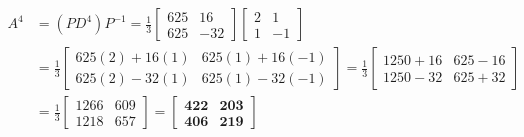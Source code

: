 \begin{enumerate}
\begin{align*}
    A^4 &= (P D^4) P^{-1} = \frac{1}{3} \begin{bmatrix} 625 & 16 \\ 625 & -32 \end{bmatrix} \begin{bmatrix} 2 & 1 \\ 1 & -1 \end{bmatrix} \\
    &= \frac{1}{3} \begin{bmatrix} 625(2) + 16(1) & 625(1) + 16(-1) \\ 625(2) - 32(1) & 625(1) - 32(-1) \end{bmatrix} = \frac{1}{3} \begin{bmatrix} 1250 + 16 & 625 - 16 \\ 1250 - 32 & 625 + 32 \end{bmatrix} \\
    &= \frac{1}{3} \begin{bmatrix} 1266 & 609 \\ 1218 & 657 \end{bmatrix} = \mathbf{\begin{bmatrix} 422 & 203 \\ 406 & 219 \end{bmatrix}}
    \end{align*}
\end{enumerate}

